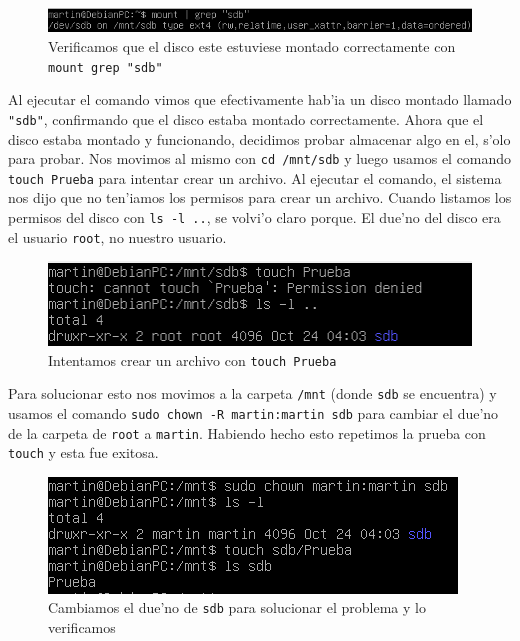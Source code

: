 \documentclass[11pt]{article}
\begin{document}
		\begin{figure}[H]
    			\centering \captionsetup{justification=centering}
    			\includegraphics[scale=0.65]{Images/rsync/rsync_disk_check.PNG}
    			\caption{Verificamos que el disco este estuviese montado correctamente con \texttt{mount \textbar\/ grep "sdb"}}
    			\label{fig:rsync_disk_check}
		\end{figure}

		Al ejecutar el comando vimos que efectivamente hab'ia un disco montado llamado \texttt{"sdb"}, confirmando que el disco estaba montado correctamente. Ahora que el disco estaba montado y funcionando, decidimos probar almacenar algo en el, s'olo para probar. Nos movimos al mismo con \texttt{cd /mnt/sdb} y luego usamos el comando \texttt{touch Prueba} para intentar crear un archivo. Al ejecutar el comando, el sistema nos dijo que no ten'iamos los permisos para crear un archivo. Cuando listamos los permisos del disco con \texttt{ls -l ..}, se volvi'o claro porque. El due'no del disco era el usuario \texttt{root}, no nuestro usuario.

		\begin{figure}[H]
    			\centering
    			\includegraphics[scale=0.75]{Images/rsync/rsync_disk_touch.PNG}
    			\caption{Intentamos crear un archivo con \texttt{touch Prueba}}
    			\label{fig:rsync_disk_touch}
		\end{figure}

		Para solucionar esto nos movimos a la carpeta \texttt{/mnt} (donde \texttt{sdb} se encuentra) y usamos el comando \texttt{sudo chown -R martin:martin sdb} para cambiar el due'no de la carpeta de \texttt{root} a \texttt{martin}. Habiendo hecho esto repetimos la prueba con \texttt{touch} y esta fue exitosa.

		\begin{figure}[H]
    			\centering \captionsetup{justification=centering}
    			\includegraphics[scale=0.75]{Images/rsync/rsync_disk_works.PNG}
    			\caption{Cambiamos el due'no de \texttt{sdb} para solucionar el problema y lo verificamos}
    			\label{fig:rsync_disk_works}
		\end{figure}
\end{document}
